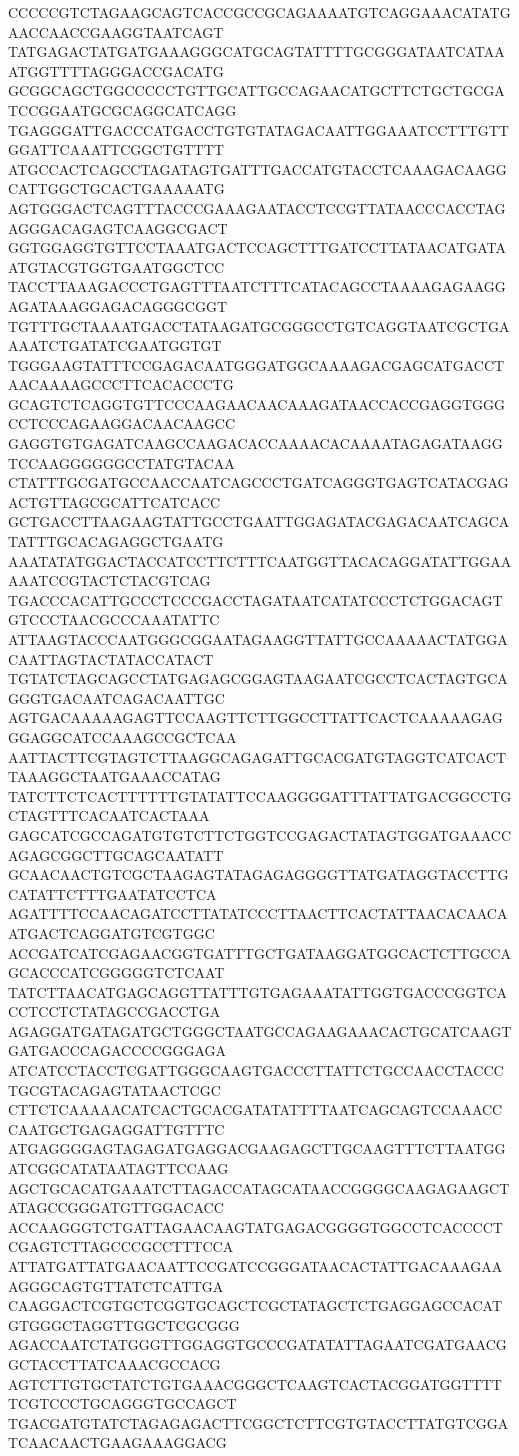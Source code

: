 CCCCCGTCTAGAAGCAGTCACCGCCGCAGAAAATGTCAGGAAACATATGAACCAACCGAAGGTAATCAGT
TATGAGACTATGATGAAAGGGCATGCAGTATTTTGCGGGATAATCATAAATGGTTTTAGGGACCGACATG
GCGGCAGCTGGCCCCCTGTTGCATTGCCAGAACATGCTTCTGCTGCGATCCGGAATGCGCAGGCATCAGG
TGAGGGATTGACCCATGACCTGTGTATAGACAATTGGAAATCCTTTGTTGGATTCAAATTCGGCTGTTTT
ATGCCACTCAGCCTAGATAGTGATTTGACCATGTACCTCAAAGACAAGGCATTGGCTGCACTGAAAAATG
AGTGGGACTCAGTTTACCCGAAAGAATACCTCCGTTATAACCCACCTAGAGGGACAGAGTCAAGGCGACT
GGTGGAGGTGTTCCTAAATGACTCCAGCTTTGATCCTTATAACATGATAATGTACGTGGTGAATGGCTCC
TACCTTAAAGACCCTGAGTTTAATCTTTCATACAGCCTAAAAGAGAAGGAGATAAAGGAGACAGGGCGGT
TGTTTGCTAAAATGACCTATAAGATGCGGGCCTGTCAGGTAATCGCTGAAAATCTGATATCGAATGGTGT
TGGGAAGTATTTCCGAGACAATGGGATGGCAAAAGACGAGCATGACCTAACAAAAGCCCTTCACACCCTG
GCAGTCTCAGGTGTTCCCAAGAACAACAAAGATAACCACCGAGGTGGGCCTCCCAGAAGGACAACAAGCC
GAGGTGTGAGATCAAGCCAAGACACCAAAACACAAAATAGAGATAAGGTCCAAGGGGGGCCTATGTACAA
CTATTTGCGATGCCAACCAATCAGCCCTGATCAGGGTGAGTCATACGAGACTGTTAGCGCATTCATCACC
GCTGACCTTAAGAAGTATTGCCTGAATTGGAGATACGAGACAATCAGCATATTTGCACAGAGGCTGAATG
AAATATATGGACTACCATCCTTCTTTCAATGGTTACACAGGATATTGGAAAAATCCGTACTCTACGTCAG
TGACCCACATTGCCCTCCCGACCTAGATAATCATATCCCTCTGGACAGTGTCCCTAACGCCCAAATATTC
ATTAAGTACCCAATGGGCGGAATAGAAGGTTATTGCCAAAAACTATGGACAATTAGTACTATACCATACT
TGTATCTAGCAGCCTATGAGAGCGGAGTAAGAATCGCCTCACTAGTGCAGGGTGACAATCAGACAATTGC
AGTGACAAAAAGAGTTCCAAGTTCTTGGCCTTATTCACTCAAAAAGAGGGAGGCATCCAAAGCCGCTCAA
AATTACTTCGTAGTCTTAAGGCAGAGATTGCACGATGTAGGTCATCACTTAAAGGCTAATGAAACCATAG
TATCTTCTCACTTTTTTGTATATTCCAAGGGGATTTATTATGACGGCCTGCTAGTTTCACAATCACTAAA
GAGCATCGCCAGATGTGTCTTCTGGTCCGAGACTATAGTGGATGAAACCAGAGCGGCTTGCAGCAATATT
GCAACAACTGTCGCTAAGAGTATAGAGAGGGGTTATGATAGGTACCTTGCATATTCTTTGAATATCCTCA
AGATTTTCCAACAGATCCTTATATCCCTTAACTTCACTATTAACACAACAATGACTCAGGATGTCGTGGC
ACCGATCATCGAGAACGGTGATTTGCTGATAAGGATGGCACTCTTGCCAGCACCCATCGGGGGTCTCAAT
TATCTTAACATGAGCAGGTTATTTGTGAGAAATATTGGTGACCCGGTCACCTCCTCTATAGCCGACCTGA
AGAGGATGATAGATGCTGGGCTAATGCCAGAAGAAACACTGCATCAAGTGATGACCCAGACCCCGGGAGA
ATCATCCTACCTCGATTGGGCAAGTGACCCTTATTCTGCCAACCTACCCTGCGTACAGAGTATAACTCGC
CTTCTCAAAAACATCACTGCACGATATATTTTAATCAGCAGTCCAAACCCAATGCTGAGAGGATTGTTTC
ATGAGGGGAGTAGAGATGAGGACGAAGAGCTTGCAAGTTTCTTAATGGATCGGCATATAATAGTTCCAAG
AGCTGCACATGAAATCTTAGACCATAGCATAACCGGGGCAAGAGAAGCTATAGCCGGGATGTTGGACACC
ACCAAGGGTCTGATTAGAACAAGTATGAGACGGGGTGGCCTCACCCCTCGAGTCTTAGCCCGCCTTTCCA
ATTATGATTATGAACAATTCCGATCCGGGATAACACTATTGACAAAGAAAGGGCAGTGTTATCTCATTGA
CAAGGACTCGTGCTCGGTGCAGCTCGCTATAGCTCTGAGGAGCCACATGTGGGCTAGGTTGGCTCGCGGG
AGACCAATCTATGGGTTGGAGGTGCCCGATATATTAGAATCGATGAACGGCTACCTTATCAAACGCCACG
AGTCTTGTGCTATCTGTGAAACGGGCTCAAGTCACTACGGATGGTTTTTCGTCCCTGCAGGGTGCCAGCT
TGACGATGTATCTAGAGAGACTTCGGCTCTTCGTGTACCTTATGTCGGATCAACAACTGAAGAAAGGACG
